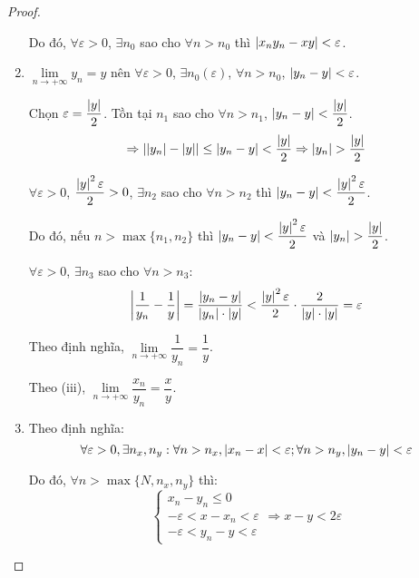 \documentclass[class=analysis,crop=false]{standalone}
\begin{document}
\begin{proof}
\begin{enumerate}[label = (\roman*)]
            \par Do đó, $\forall\varepsilon > 0$, $\exists n_{0}$ sao cho $\forall n > n_{0}$ thì $\left\vert{x_{n}y_{n} - xy}\right\vert < \varepsilon$.
        \item $\lim\limits_{n\to+\infty}y_{n} = y$ nên $\forall\varepsilon > 0$, $\exists n_{0}(\varepsilon)$, $\forall n > n_{0}$, $\left\vert{y_{n} - y}\right\vert < \varepsilon$.
            \par Chọn $\varepsilon = \dfrac{\left\vert{y}\right\vert}{2}$. Tồn tại $n_{1}$ sao cho $\forall n > n_{1}$, $\left\vert{y_{n} - y}\right\vert < \dfrac{\left\vert{y}\right\vert}{2}$.
            \[
                \Rightarrow \left\vert{\left\vert{y_{n}}\right\vert - \left\vert{y}\right\vert}\right\vert \le \left\vert{y_{n} - y}\right\vert < \frac{\left\vert{y}\right\vert}{2} \Rightarrow \left\vert{y_{n}}\right\vert > \frac{\left\vert{y}\right\vert}{2}
            \]
            \par $\forall\varepsilon > 0$, $\dfrac{\left\vert{y}\right\vert^{2}\varepsilon}{2} > 0$, $\exists n_{2}$ sao cho $\forall n > n_{2}$ thì $\left\vert{y_{n} - y}\right\vert < \dfrac{\left\vert{y}\right\vert^{2}\varepsilon}{2}$.
            \par Do đó, nếu $n > \max\{n_{1}, n_{2}\}$ thì $\left\vert{y_{n} - y}\right\vert < \dfrac{\left\vert{y}\right\vert^{2}\varepsilon}{2}$ và $\left\vert{y_{n}}\right\vert > \dfrac{\left\vert{y}\right\vert}{2}$.
            \par $\forall\varepsilon > 0$, $\exists n_{3}$ sao cho $\forall n > n_{3}$:
            \[
                \left\vert{\frac{1}{y_{n}} - \frac{1}{y}}\right\vert = \frac{\left\vert{y_{n} - y}\right\vert}{\left\vert{y_{n}}\right\vert\cdot\left\vert{y}\right\vert} < \frac{\left\vert{y}\right\vert^{2}\varepsilon}{2}\cdot\frac{2}{\left\vert{y}\right\vert\cdot\left\vert{y}\right\vert} = \varepsilon
            \]
            \par Theo định nghĩa, $\lim\limits_{n\to+\infty}\dfrac{1}{y_{n}} = \dfrac{1}{y}$.
            \par Theo (iii), $\lim\limits_{n\to+\infty}\dfrac{x_{n}}{y_{n}} = \dfrac{x}{y}$.
        \item Theo định nghĩa:
            \[
                \forall\varepsilon > 0, \exists n_{x}, n_{y}: \forall n > n_{x}, \left\vert{x_{n} - x}\right\vert < \varepsilon; \forall n > n_{y}, \left\vert{y_{n} - y}\right\vert < \varepsilon
            \]
            \par Do đó, $\forall n > \max\{ N, n_{x}, n_{y} \}$ thì:
            \[
                \begin{cases}
                    x_{n} - y_{n} \le 0 \\
                    -\varepsilon < x - x_{n} < \varepsilon \\
                    -\varepsilon < y_{n} - y < \varepsilon
                \end{cases}
                \Rightarrow
                x - y < 2\varepsilon
            \]

\end{enumerate}
\end{proof}
\end{document}

